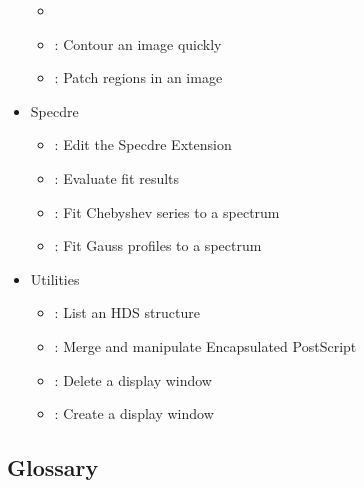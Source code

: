 \documentclass[11pt,noabs]{starlink}
\begin{document}
\begin{itemize}
\begin{itemize}
   \item {}
   \item {}: Contour an image quickly
   \item {}: Patch regions in an image
   \end{itemize}
\item Specdre 
   \begin{itemize}
   \item {}: Edit the Specdre Extension
   \item {}: Evaluate fit results
   \item {}: Fit Chebyshev series to a spectrum
   \item {}: Fit Gauss profiles to a spectrum
   \end{itemize}
\item Utilities
   \begin{itemize}
   \item {}: List an HDS structure
   \item {}: Merge and manipulate Encapsulated PostScript
   \item {}: Delete a display window
   \item {}: Create a display window
   \end{itemize}
\end{itemize}

\subsection{\label{gloss}Glossary}
\end{document}
